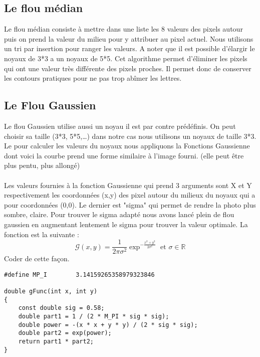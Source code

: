 \documentclass{article}
\begin{document}
\subsection{Le flou médian}
Le flou médian consiste à mettre dans une liste les 8 valeurs des pixels autour puis on prend la valeur du milieu pour y attribuer au pixel actuel. Nous utilisons un tri par insertion pour ranger les valeurs. A noter que il est possible d’élargir le noyaux de 3*3 a un noyaux de 5*5. Cet algorithme permet d’éliminer les pixels qui ont une valeur très différente des pixels proches. Il permet donc de conserver les contours pratiques pour ne pas trop abîmer les lettres.
\subsection{Le Flou Gaussien}
Le flou Gaussien utilise aussi un noyau il est par contre prédéfinis. On peut choisir sa taille (3*3, 5*5,…) dans notre cas nous utilisons un noyaux de taille 3*3. Le pour calculer les valeurs du noyaux nous appliquons la Fonctions Gaussienne dont voici la courbe prend une forme similaire à l'image fourni. (elle peut être plus pentu, plus allongé)
\paragraph{}
Les valeurs fournies à la fonction Gaussienne qui prend 3 arguments sont X et Y respectivement les coordonnées (x,y) des pixel autour du milieux du noyaux qui a pour coordonnées (0,0). Le dernier est "sigma" qui permet de rendre la photo plus sombre, claire. Pour trouver le sigma adapté nous avons lancé plein de flou gaussien en augmentant lentement le sigma pour trouver la valeur optimale. La fonction est la suivante :
$$
\mathcal{G}(x,y) = \frac{1}{2\pi\sigma^2}\exp^{-\frac{x^2+y^2}{2\sigma^2}} \mbox{~et~} \sigma \in \mathbb{R}
$$
Coder de cette façon.
\begin{lstlisting}
#define MP_I        3.14159265358979323846

double gFunc(int x, int y) 
{
    const double sig = 0.58;
    double part1 = 1 / (2 * M_PI * sig * sig);
    double power = -(x * x + y * y) / (2 * sig * sig);
    double part2 = exp(power);
    return part1 * part2;
}
\end{lstlisting}
\end{document}

